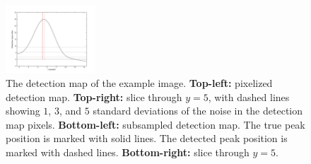 \documentclass[letterpaper,preprint]{aastex}
\newcommand{\figpart}[1]{\textbf{#1}}
\begin{document}
\begin{figure}[p!]
\begin{center}
\includegraphics[width=0.3\textwidth]{f04b-bw}
\end{center}
\caption{The detection map of the example image.  \figpart{Top-left:}
  pixelized detection map.  \figpart{Top-right:} slice through $y=5$,
  with dashed lines showing $1$, $3$, and $5$ standard deviations of
  the noise in the detection map pixels.  \figpart{Bottom-left:}
  subsampled detection map. The true peak position is marked with
  solid lines.  The detected peak position is marked with dashed
  lines.  \figpart{Bottom-right:} slice through $y=5$.
\label{fig:detmap}}
\end{figure}
\end{document}
